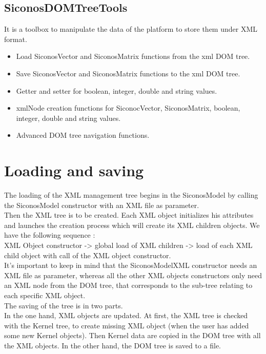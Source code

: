 \subsection{SiconosDOMTreeTools}
It is a toolbox to manipulate the data of the platform to store them under XML format.
\begin{itemize}
	\item Load SiconosVector and SiconosMatrix functions from the \ac{xml} DOM tree.
	\item Save SiconosVector and SiconosMatrix functions to the \ac{xml} DOM tree.
	\item Getter and setter for boolean, integer, double and string values.
	\item xmlNode creation functions for SiconocVector, SiconosMatrix, boolean, integer, double and string values.
	\item Advanced DOM tree navigation functions.
\end{itemize}


\section{Loading and saving}
The loading of the XML management tree begins in the SiconosModel by calling the SiconosModel constructor with an XML file as parameter.\\
Then the XML tree is to be created. Each XML object initializes his attributes and launches the creation process which will create its XML children objects. We have the following sequence :\\
XML Object constructor -> global load of XML children -> load of each XML child object with call of the XML object constructor.\\
It's important to keep in mind that the SiconosModelXML constructor needs an XML file as parameter, whereas all the other XML objects constructors only need an XML node from the DOM tree, that corresponds to the sub-tree relating to each specific XML object.\\
The saving of the tree is in two parts.\\
In the one hand, XML objects are updated. At first, the XML tree is checked with the Kernel tree, to create missing XML object (when the user has added some new Kernel objects). Then Kernel data are copied in the DOM tree with all the XML objects.
In the other hand, the DOM tree is saved to a file.
